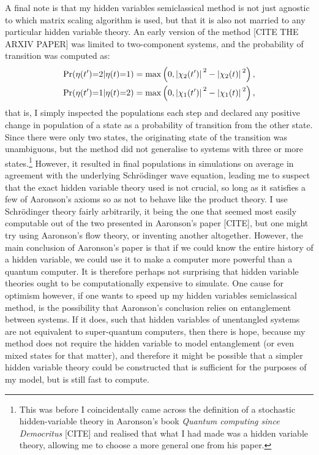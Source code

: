 A final note is that my hidden variables semiclassical method is not just agnostic to which matrix scaling algorithm is used, but that it is also not married to any particular hidden variable theory. An early version of the method [CITE THE ARXIV PAPER] was limited to two-component systems, and the probability of transition was computed as:
\begin{align}
\Pr(\eta(t^\prime){=}2|\eta(t){=}1) &=
\max\left(0, \abs{\chi_2(t^\prime)}^2 - \abs{\chi_2(t)}^2\right),\\
\Pr(\eta(t^\prime){=}1|\eta(t){=}2) &= 
\max\left(0, \abs{\chi_1(t^\prime)}^2 - \abs{\chi_1(t)}^2\right),
\end{align}
that is, I simply inspected the populations each step and declared any positive change in population of a state as a probability of transition from the other state. Since there were only two states, the originating state of the transition was unambiguous, but the method did not generalise to systems with three or more states.\footnote{This was before I coincidentally came across the definition of a stochastic hidden-variable theory in Aaronson's book \emph{Quantum computing since Democritus} [CITE] and realised that what I had made was a hidden variable theory, allowing me to choose a more general one from his paper.} However, it resulted in final populations in simulations on average in agreement with the underlying Schr\"odinger wave equation, leading me to suspect that the exact hidden variable theory used is not crucial, so long as it satisfies a few of Aaronson's axioms so as not to behave like the product theory. I use Schr\"odinger theory fairly arbitrarily, it being the one that seemed most easily computable out of the two presented in Aaronson's paper [CITE], but one might try using Aaronson's flow theory, or inventing another altogether. However, the main conclusion of Aaronson's paper is that if we could know the entire history of a hidden variable, we could use it to make a computer more powerful than a quantum computer. It is therefore perhaps not surprising that hidden variable theories ought to be computationally expensive to simulate. One cause for optimism however, if one wants to speed up my hidden variables semiclassical method, is the possibility that Aaronson's conclusion relies on entanglement between systems. If it does, such that hidden variables of unentangled systems are not equivalent to super-quantum computers, then there is hope, because my method does not require the hidden variable to model entanglement (or even mixed states for that matter), and therefore it might be possible that a simpler hidden variable theory could be constructed that is sufficient for the purposes of my model, but is still fast to compute.

